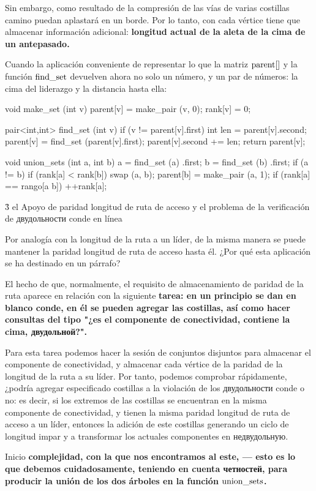 Sin embargo, como resultado de la compresión de las vías de varias costillas camino puedan aplastará en un borde. Por lo tanto, con cada vértice tiene que almacenar información adicional: \bf{longitud actual de la aleta de la cima de un antepasado}.

Cuando la aplicación conveniente de representar lo que la matriz ${\rm parent}[]$ y la función $\rm find\_set$ devuelven ahora no solo un número, y un par de números: la cima del liderazgo y la distancia hasta ella:

\code
void make_set (int v) {
parent[v] = make_pair (v, 0);
rank[v] = 0;
}

pair<int,int> find_set (int v) {
if (v != parent[v].first) {
int len = parent[v].second;
parent[v] = find_set (parent[v].first);
parent[v].second += len;
}
return parent[v];
}

void union_sets (int a, int b) {
a = find_set (a) .first;
b = find_set (b) .first;
if (a != b) {
if (rank[a] < rank[b])
swap (a, b);
parent[b] = make_pair (a, 1);
if (rank[a] == rango[a b])
++rank[a];
}
}
\endcode



\h3{ el Apoyo de paridad longitud de ruta de acceso y el problema de la verificación de двудольности conde en línea }

Por analogía con la longitud de la ruta a un líder, de la misma manera se puede mantener la paridad longitud de ruta de acceso hasta él. ¿Por qué esta aplicación se ha destinado en un párrafo?

El hecho de que, normalmente, el requisito de almacenamiento de paridad de la ruta aparece en relación con la siguiente \bf{tarea}: en un principio se dan en blanco conde, en él se pueden agregar las costillas, así como hacer consultas del tipo "¿es el componente de conectividad, contiene la cima, \bf{двудольной}?".

Para esta tarea podemos hacer la sesión de conjuntos disjuntos para almacenar el componente de conectividad, y almacenar cada vértice de la paridad de la longitud de la ruta a su líder. Por tanto, podemos comprobar rápidamente, ¿podría agregar especificado costillas a la violación de los двудольности conde o no: es decir, si los extremos de las costillas se encuentran en la misma componente de conectividad, y tienen la misma paridad longitud de ruta de acceso a un líder, entonces la adición de este costillas generando un ciclo de longitud impar y a transformar los actuales componentes en недвудольную.

Inicio \bf{complejidad}, con la que nos encontramos al este, --- esto es lo que debemos cuidadosamente, teniendo en cuenta четностей, para producir la unión de los dos árboles en la función $\rm union\_sets$.

